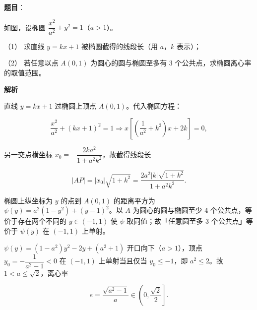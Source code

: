 \begin{answer}

\textbf{题目}：

如图，设椭圆 \(\dfrac{x^{2}}{a^{2}}+y^{2}=1\)（\(a>1\)）。

（1） 求直线 \(y=kx+1\) 被椭圆截得的线段长（用 \(a\)，\(k\) 表示）；

（2） 若任意以点 \(A(0,1)\) 为圆心的圆与椭圆至多有 3 个公共点，求椭圆离心率的取值范围。
\nopagebreak[4]
\begin{center}\end{center}
\nopagebreak[4]
\textbf{解析}


直线 \(y=kx+1\) 过椭圆上顶点 \(A(0,1)\)。代入椭圆方程：

\nopagebreak[4]
\[
\dfrac{x^{2}}{a^{2}}+(kx+1)^{2}=1\Longrightarrow x\left[\left(\dfrac{1}{a^{2}}+k^{2}\right)x+2k\right]=0,
\]

另一交点横坐标 \(x_{0}=-\dfrac{2ka^{2}}{1+a^{2}k^{2}}\)，故截得线段长

\nopagebreak[4]
\[
|AP|=|x_{0}|\sqrt{1+k^{2}}=\dfrac{2a^{2}|k|\sqrt{1+k^{2}}}{1+a^{2}k^{2}}.
\]


椭圆上纵坐标为 \(y\) 的点到 \(A(0,1)\) 的距离平方为 \(\psi(y)=a^{2}(1-y^{2})+(y-1)^{2}\)。以 \(A\) 为圆心的圆与椭圆至少 4 个公共点，等价于存在两个不同的 \(y\in(-1,1)\) 使 \(\psi\) 取同值；故「任意圆至多 3 个公共点」等价于 \(\psi(y)\) 在 \((-1,1)\) 上单射。

\(\psi(y)=(1-a^{2})y^{2}-2y+(a^{2}+1)\) 开口向下（\(a>1\)），顶点 \(y_{0}=-\dfrac{1}{a^{2}-1}<0\) 在 \((-1,1)\) 上单射当且仅当 \(y_{0}\leqslant-1\)，即 \(a^{2}\leqslant 2\)。故 \(1<a\leqslant\sqrt{2}\)，离心率

\nopagebreak[4]
\[
e=\dfrac{\sqrt{a^{2}-1}}{a}\in\left(0,\dfrac{\sqrt{2}}{2}\right].
\]


\gkanswer{答案（2）：离心率的取值范围是 \(\left(0,\dfrac{\sqrt{2}}{2}\right]\)。}

\end{answer}
